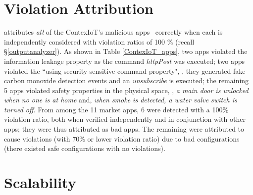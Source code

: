 \section{Violation Attribution}
\sys attributes {\em all} of the ContexIoT's malicious apps~\cite{Jia:contexiot} correctly when each is independently considered
with violation ratios of 100 \% (recall \S\ref{outputanalyzer}). {\color{black}As shown in Table \ref{ContexIoT_apps},}
two apps violated the information leakage property as the command \textit{httpPost} was executed;
two apps violated the ``using security-sensitive command property",
\ie, they generated fake carbon monoxide detection events and an \textit{unsubscribe} is executed;
the remaining 5 apps violated safety properties in the physical space,
\eg, \textit{a main door is unlocked when no one is at home} and, \textit{when smoke is detected, a water valve switch is turned off}.
From among the 11 market apps, 6 were detected with a 100\% violation ratio,
both when verified independently and in conjunction with other apps; they were thus attributed as bad apps.
The remaining were attributed to cause violations (with 70\% or lower violation ratio)
due to bad configurations 
(there existed safe configurations with no violations).

\section{Scalability}

